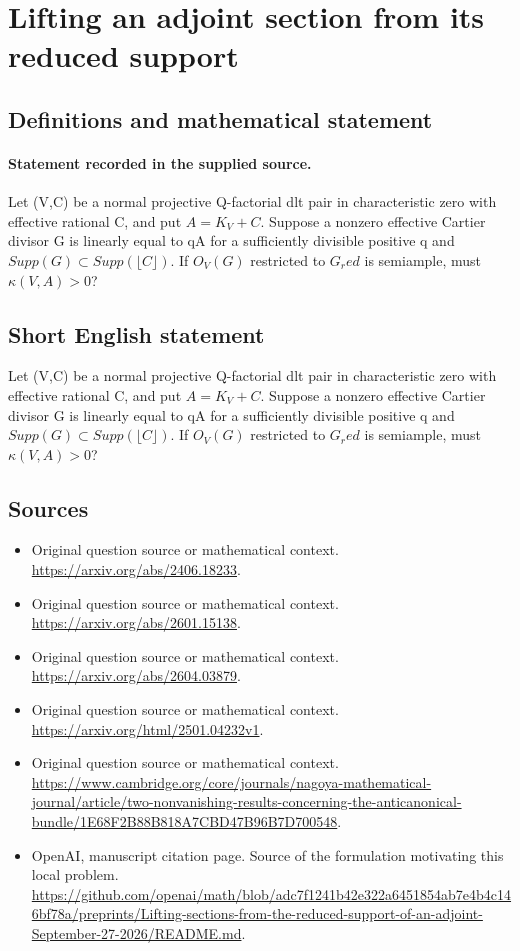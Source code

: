 \documentclass[11pt]{article}
\begin{document}
\section*{Lifting an adjoint section from its reduced support}\label{30007069}
\subsection{Definitions and mathematical statement}
\paragraph{Statement recorded in the supplied source.}
Let (V,C) be a normal projective Q-factorial dlt pair in characteristic zero with effective rational C, and put $A=K_V+C$. Suppose a nonzero effective Cartier divisor G is linearly equal to qA for a sufficiently divisible positive q and $Supp(G)\subset Supp(\lfloor C\rfloor )$. If $O_V(G)$ restricted to $G_red$ is semiample, must $\kappa (V,A)>0$?
\subsection{Short English statement}
Let (V,C) be a normal projective Q-factorial dlt pair in characteristic zero with effective rational C, and put $A=K_V+C$. Suppose a nonzero effective Cartier divisor G is linearly equal to qA for a sufficiently divisible positive q and $Supp(G)\subset Supp(\lfloor C\rfloor )$. If $O_V(G)$ restricted to $G_red$ is semiample, must $\kappa (V,A)>0$?
\subsection{Sources}
\begin{itemize}
\item[S1] Original question source or mathematical context.
\url{https://arxiv.org/abs/2406.18233}.
\item[S2] Original question source or mathematical context.
\url{https://arxiv.org/abs/2601.15138}.
\item[S3] Original question source or mathematical context.
\url{https://arxiv.org/abs/2604.03879}.
\item[S4] Original question source or mathematical context.
\url{https://arxiv.org/html/2501.04232v1}.
\item[S5] Original question source or mathematical context.
\url{https://www.cambridge.org/core/journals/nagoya-mathematical-journal/article/two-nonvanishing-results-concerning-the-anticanonical-bundle/1E68F2B88B818A7CBD47B96B7D700548}.
\item[S6] OpenAI, manuscript citation page. Source of the formulation motivating this local problem.
\url{https://github.com/openai/math/blob/adc7f1241b42e322a6451854ab7e4b4c146bf78a/preprints/Lifting-sections-from-the-reduced-support-of-an-adjoint-September-27-2026/README.md}.
\end{itemize}
\end{document}
